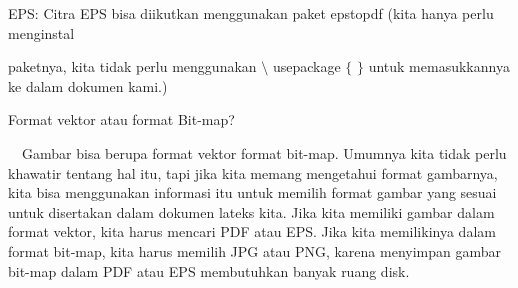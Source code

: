 \noindent
EPS: Citra EPS bisa diikutkan menggunakan paket epstopdf (kita hanya perlu menginstal  \par
\vspace{12pt}
\noindent
paketnya, kita $  $tidak perlu menggunakan  $  \setminus $ usepackage  $  \{  $ $  \}  $ untuk memasukkannya ke dalam dokumen kami.) \par
\vspace{12pt}
\noindent
Format vektor atau format Bit-map? \par
\noindent
 $  $ $  $ $  $ $  $Gambar bisa berupa format vektor format bit-map. Umumnya kita tidak perlu khawatir tentang hal itu, tapi jika kita memang mengetahui format gambarnya, kita bisa menggunakan informasi itu untuk memilih format gambar yang sesuai untuk disertakan dalam dokumen lateks kita. Jika kita memiliki gambar dalam format vektor, kita harus mencari PDF atau EPS. Jika kita memilikinya dalam format bit-map, kita harus memilih JPG atau PNG, karena menyimpan gambar bit-map dalam PDF atau EPS membutuhkan banyak ruang disk. \par
\vspace{20pt}

